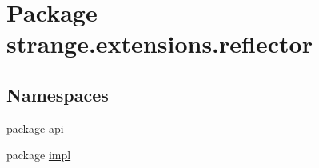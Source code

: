 \hypertarget{namespacestrange_1_1extensions_1_1reflector}{\section{Package strange.\-extensions.\-reflector}
\label{namespacestrange_1_1extensions_1_1reflector}
}
\subsection*{Namespaces}
\begin{DoxyCompactItemize}
\item 
package \hyperlink{namespacestrange_1_1extensions_1_1reflector_1_1api}{api}
\item 
package \hyperlink{namespacestrange_1_1extensions_1_1reflector_1_1impl}{impl}
\end{DoxyCompactItemize}
